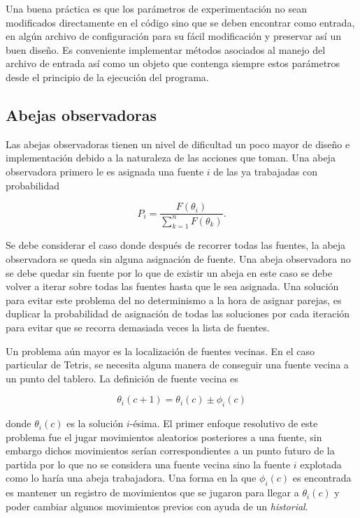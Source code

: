 Una buena práctica es que los parámetros de experimentación no sean modificados 
directamente en el código sino que se deben encontrar como entrada, en algún archivo 
de configuración para su fácil modificación y preservar así un buen diseño. Es 
conveniente implementar métodos asociados al manejo del archivo de entrada así como un objeto 
que contenga siempre estos parámetros desde el principio de la ejecución del programa.

\subsection{Abejas observadoras}

Las abejas observadoras tienen un nivel de dificultad un poco mayor de diseño e 
implementación debido a la naturaleza de las acciones que toman. Una abeja 
observadora primero le es asignada una fuente $i$ de las ya trabajadas con 
probabilidad 

\begin{displaymath}
  P_{i} = \frac{F(\theta_{i})}{\sum_{k=1}^{n} F(\theta_{k})}.
\end{displaymath}

Se debe considerar el caso donde después de recorrer todas las fuentes, la 
abeja observadora se queda sin alguna asignación de fuente. 
Una abeja observadora no se debe quedar 
sin fuente por lo que de existir un abeja en este caso se debe volver a iterar 
sobre todas las fuentes hasta que le sea asignada. Una solución para evitar este 
problema del no determinismo a la hora de asignar parejas, es duplicar la 
probabilidad de asignación de todas las soluciones por cada iteración para 
evitar que se recorra demasiada veces la lista de fuentes. 

Un problema aún mayor es la localización de fuentes vecinas. En el caso particular 
de Tetris, se necesita alguna manera de conseguir una fuente vecina a un punto 
del tablero. La definición de fuente vecina es 

\begin{displaymath}
  \theta_{i}(c+1) = \theta_{i}(c) \pm \phi_{i}(c)
\end{displaymath}

\noindent
donde $\theta_{i}(c)$ es la solución $i$-ésima. El primer enfoque resolutivo de este 
problema fue el jugar movimientos aleatorios posteriores a una fuente, 
sin embargo dichos movimientos serían correspondientes a un punto futuro de la partida 
por lo que no se considera una fuente vecina sino la fuente $i$ explotada como 
lo haría una abeja trabajadora. 
Una forma en la que $\phi_{i}(c)$ es encontrada es mantener un registro de 
movimientos que se jugaron para llegar a $\theta_{i}(c)$ y poder cambiar algunos 
movimientos previos con ayuda de un \textit{historial}.

